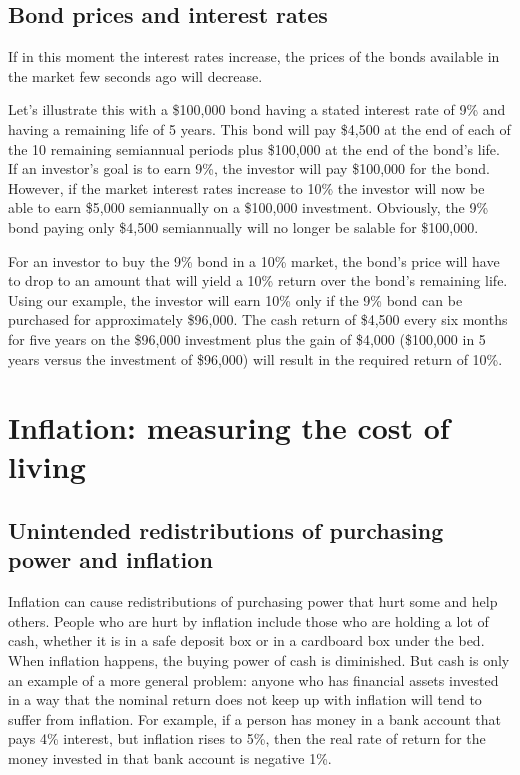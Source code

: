 \subsection{Bond prices and interest rates}
If in this moment the interest rates increase, the prices of the bonds available in the market few seconds ago will decrease.

Let's illustrate this with a \$100,000 bond having a stated interest rate of 9\% and having a remaining life of 5 years. This bond will pay \$4,500 at the end of each of the 10 remaining semiannual periods plus \$100,000 at the end of the bond's life. If an investor's goal is to earn 9\%, the investor will pay \$100,000 for the bond. However, if the market interest rates increase to 10\% the investor will now be able to earn \$5,000 semiannually on a \$100,000 investment. Obviously, the 9\% bond paying only \$4,500 semiannually will no longer be salable for \$100,000.

For an investor to buy the 9\% bond in a 10\% market, the bond's price will have to drop to an amount that will yield a 10\% return over the bond's remaining life. Using our example, the investor will earn 10\% only if the 9\% bond can be purchased for approximately \$96,000. The cash return of \$4,500 every six months for five years on the \$96,000 investment plus the gain of \$4,000 (\$100,000 in 5 years versus the investment of \$96,000) will result in the required return of 10\%.


\section{Inflation: measuring the cost of living}

\subsection{Unintended redistributions of purchasing power and inflation}
Inflation can cause redistributions of purchasing power that hurt some and help others. People who are hurt by inflation include those who are holding a lot of cash, whether it is in a safe deposit box or in a cardboard box under the bed. When inflation happens, the buying power of cash is diminished. But cash is only an example of a more general problem: anyone who has financial assets invested in a way that the nominal return does not keep up with inflation will tend to suffer from inflation. For example, if a person has money in a bank account that pays 4\% interest, but inflation rises to 5\%, then the real rate of return for the money invested in that bank account is negative 1\%.


